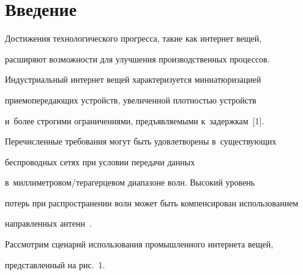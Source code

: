 














 \thispagestyle{headings}


 


 \vspace*{-12pt}





\section{Введение}





   Достижения технологического прогресса, такие как интернет вещей, 


расширяют возможности для улучшения производственных процессов. 


Индустриальный интернет вещей характеризуется миниатюризацией  


прие\-мо\-пе\-ре\-да\-ющих устройств, увеличенной плотностью устройств 


и~более строгими ограничениями, предъявляемыми к~задержкам~[1]. 


Перечисленные требования могут быть удовле\-тво\-ре\-ны в~существующих 


беспроводных сетях при условии передачи данных  


в~мил\-ли\-мет\-ро\-вом/те\-ра\-гер\-це\-вом диапазоне волн. Высокий уровень 


потерь при распространении волн может быть компенсирован использованием 


направленных антенн~\cite{2-gai, 3-gai}.





Рассмотрим сценарий использования промышленного интернета вещей, 


представленный на рис.~1. 








